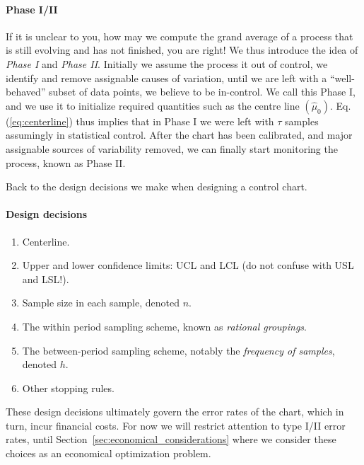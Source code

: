 \paragraph{Phase I/II} If it is unclear to you, how may we compute the grand average of a process that is still evolving and has not finished, you are right! We thus introduce the idea of \emph{Phase I} and \emph{Phase II}. 
Initially we assume the process it out of control, we identify and remove assignable causes of variation, until we are left with a ``well-behaved'' subset of data points, we believe to be in-control. We call this Phase I, and we use it to initialize required quantities such as the centre line $(\hat{\mu}_0)$. 
Eq.(\ref{eq:centerline}) thus implies that in Phase I we were left with $\tau$ samples assumingly in statistical control.
After the chart has been calibrated, and major assignable sources of variability removed, we can finally start monitoring the process, known as Phase II.

\bigskip

Back to the design decisions we make when designing a control chart.
\begin{tcolorbox}[breakable]
\paragraph{Design decisions}
\begin{enumerate}
\item Centerline.
\item Upper and lower confidence limits: UCL and LCL (do not confuse with USL and LSL!).
\item Sample size in each sample, denoted $n$.
\item The within period sampling scheme, known as \emph{rational groupings}.
\item The between-period sampling scheme, notably the \emph{frequency of samples}, denoted $h$. 
\item Other stopping rules.
\end{enumerate}
\end{tcolorbox}

These design decisions ultimately govern the error rates of the chart, which in turn, incur financial costs. 
For now we will restrict attention to type I/II error rates, until Section~\ref{sec:economical_considerations} where we consider these choices as an economical optimization problem.

